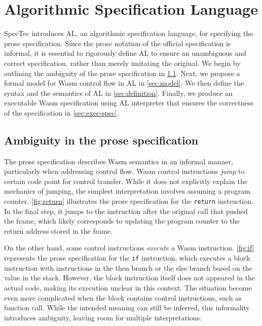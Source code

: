 \chapter{Algorithmic Specification Language}
\label{ch:al}
\noindent


SpecTec introduces AL, an algorithmic specification language, for specifying
the prose specification.
Since the prose notation of the official specification is informal, it is
essential to rigorously define AL to ensure an unambiguous and correct
specification, rather than merely imitating the original.
We begin by outlining the ambiguity of the prose specification in
\cref{sec:prose-informal}.
Next, we propose a formal model for Wasm control flow in AL in
\cref{sec:model}.
We then define the syntax and the semantics of AL in \cref{sec:definition}.
Finally, we produce an executable Wasm specification using AL interpreter that
ensures the correctness of the specification in \cref{sec:exec-spec}.

\section{Ambiguity in the prose specification}
\label{sec:prose-informal}

The prose specification describes Wasm semantics in an informal manner,
particularly when addressing control flow.
Wasm control instructions \textit{jump} to certain code point for control
transfer.
While it does not explicitly explain the mechanics of jumping, the simplest
interpretation involves assuming a program counter.
\cref{fig:return} illustrates the prose specification for the \texttt{return}
instruction.
In the final step, it jumps to the instruction after the original call that
pushed the frame, which likely corresponds to updating the program counter to
the return address stored in the frame.


On the other hand, some control instructions \textit{execute} a Wasm
instruction.
\cref{fig:if} represents the prose specification for the \texttt{if}
instruction, which executes a block instruction with instructions in the then
branch or the else branch based on the value in the stack.
However, the block instruction itself does not appeared in the actual code,
making its execution unclear in this context.
The situation become even more complicated when the block contains control
instructions, such as function call.
While the intended meaning can still be inferred, this informality introduces
ambiguity, leaving room for multiple interpretations.


